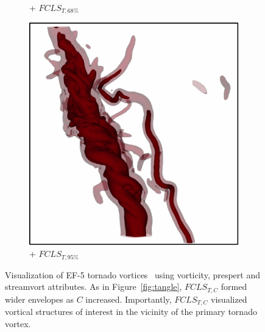 \begin{figure}[!h]
\begin{subfigure}{0.20\linewidth}
\vspace{-1mm}
\caption{+ $FCLS_{T,68\%}$}
\vspace{-2mm}
\label{fig:tornado_fls}
\end{subfigure}
\begin{subfigure}{0.20\linewidth}
\centering
\includegraphics[width=0.9\linewidth]{Images/Tornado/fcls_95.pdf}
\vspace{-1mm}
\caption{+ $FCLS_{T,95\%}$}
\vspace{-2mm}
\label{fig:tornado_fcls}
\end{subfigure}
\caption{Visualization of EF-5 tornado vortices~\cite{atmos10100578} using vorticity, prespert and streamvort attributes. As in Figure~\ref{fig:tangle}, $FCLS_{T,C}$ formed wider envelopes as $C$ increased. Importantly, $FCLS_{T,C}$ visualized vortical structures of interest in the vicinity of the primary tornado vortex.}
\vspace{-5mm}
\label{fig:tornado}
\end{figure}
